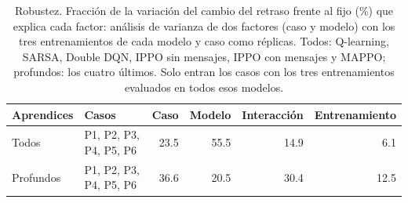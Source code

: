 \begin{table}[H]
\centering
\small
\begin{tabular}{llrrrr}
\toprule
Aprendices & Casos & Caso & Modelo & Interacción & Entrenamiento \\
\midrule
Todos & P1, P2, P3, P4, P5, P6 & 23.5 & 55.5 & 14.9 & 6.1 \\
Profundos & P1, P2, P3, P4, P5, P6 & 36.6 & 20.5 & 30.4 & 12.5 \\
\bottomrule
\end{tabular}
\caption[Robustez: de qué depende el resultado]{Robustez. Fracción de la variación del cambio del retraso frente al fijo (\%) que explica cada factor: análisis de varianza de dos factores (caso y modelo) con los tres entrenamientos de cada modelo y caso como réplicas. Todos: Q-learning, SARSA, Double DQN, IPPO sin mensajes, IPPO con mensajes y MAPPO; profundos: los cuatro últimos. Solo entran los casos con los tres entrenamientos evaluados en todos esos modelos.}
\label{tab:robustez-anova}
\end{table}
